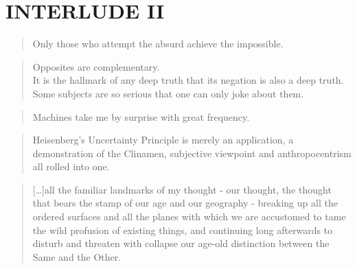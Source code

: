 
\pagestyle{empty}

\chapter*{INTERLUDE II}
\label{interlude2}


\begin{quotation}
    Only those who attempt the absurd achieve the impossible. 
\end{quotation}

\begin{quotation}
  Opposites are complementary.\\
  It is the hallmark of any deep truth that its negation is also a deep truth.\\
  Some subjects are so serious that one can only joke about them.
\end{quotation}

\begin{quotation}
    Machines take me by surprise with great frequency.
\end{quotation}

\begin{quotation}
    Heisenberg's Uncertainty Principle is merely an application, a demonstration of the Clinamen, subjective viewpoint and anthropocentrism all rolled into one. 
\end{quotation}

\begin{quotation}
  [\ldots]all the familiar landmarks of my thought - our thought, the thought that bears the stamp of our age and our geography - breaking up all the ordered surfaces and all the planes with which we are accustomed to tame the wild profusion of existing things, and continuing long afterwards to disturb and threaten with collapse our age-old distinction between the Same and the Other. 
\end{quotation}


\pagestyle{fania}


\clearpage